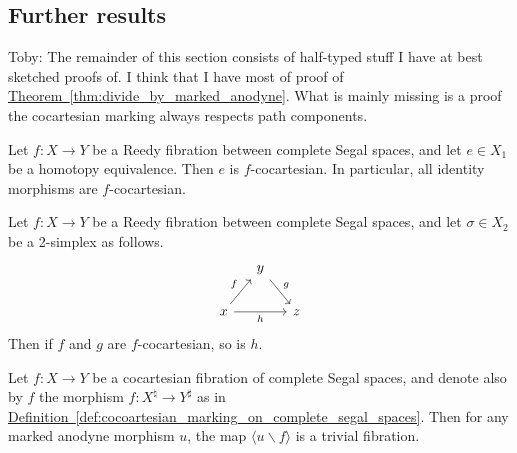 \documentclass[main.tex]{subfiles}
\begin{document}
\subsection{Further results}
\label{ssc:further_results}

\begin{note}
  Toby: The remainder of this section consists of half-typed stuff I have at best sketched proofs of. I think that I have most of proof of \hyperref[thm:divide_by_marked_anodyne]{Theorem~\ref*{thm:divide_by_marked_anodyne}}. What is mainly missing is a proof the cocartesian marking always respects path components.
\end{note}

\begin{lemma}
  Let $f\colon X \to Y$ be a Reedy fibration between complete Segal spaces, and let $e \in X_{1}$ be a homotopy equivalence. Then $e$ is $f$-cocartesian. In particular, all identity morphisms are $f$-cocartesian.
\end{lemma}

\begin{lemma}
  \label{lemma:cocartesian_closed_under_composition}
  Let $f\colon X \to Y$ be a Reedy fibration between complete Segal spaces, and let $\sigma \in X_{2}$ be a 2-simplex as follows.
  \begin{equation*}
    \begin{tikzcd}[column sep=small]
      & y
      \arrow[dr, "g"]
      \\
      x
      \arrow[ur, "f"]
      \arrow[rr, swap, "h"]
      && z
    \end{tikzcd}
  \end{equation*}
  Then if $f$ and $g$ are $f$-cocartesian, so is $h$.
\end{lemma}

\begin{theorem}
  \label{thm:divide_by_marked_anodyne}
  Let $f\colon X \to Y$ be a cocartesian fibration of complete Segal spaces, and denote also by $f$ the morphism $f\colon X^{\natural} \to Y^{\sharp}$ as in \hyperref[def:cocoartesian_marking_on_complete_segal_spaces]{Definition~\ref*{def:cocoartesian_marking_on_complete_segal_spaces}}. Then for any marked anodyne morphism $u$, the map $\langle u \backslash f \rangle$ is a trivial fibration.
\end{theorem}
\end{document}
